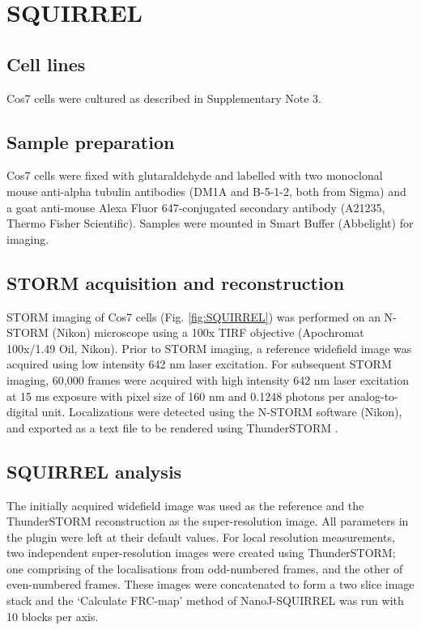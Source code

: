 \section{SQUIRREL}

\subsection{Cell lines}
Cos7 cells were cultured as described in Supplementary Note 3.

\subsection{Sample preparation}

Cos7 cells were fixed with glutaraldehyde and labelled with two monoclonal mouse anti-alpha tubulin antibodies (DM1A and B-5-1-2, both from Sigma) and a goat anti-mouse Alexa Fluor 647-conjugated secondary antibody (A21235, Thermo Fisher Scientific). Samples were mounted in Smart Buffer (Abbelight) for imaging.

\subsection{STORM acquisition and reconstruction}

STORM imaging of Cos7 cells (Fig. \ref{fig:SQUIRREL}) was performed on an N-STORM (Nikon) microscope using a 100x TIRF objective (Apochromat 100x/1.49 Oil, Nikon). Prior to STORM imaging, a reference widefield image was acquired using low intensity 642 nm laser excitation. For subsequent STORM imaging, 60,000 frames were acquired with high intensity 642 nm laser excitation at 15 ms exposure with pixel size of 160 nm and 0.1248 photons per analog-to-digital unit. Localizations were detected using the N-STORM software (Nikon), and exported as a text file to be rendered using ThunderSTORM \cite{ovesny2014thunderstorm}.

\subsection{SQUIRREL analysis}

The initially acquired widefield image was used as the reference and the ThunderSTORM reconstruction as the super-resolution image. All parameters in the plugin were left at their default values. For local resolution measurements, two independent super-resolution images were created using ThunderSTORM; one comprising of the localisations from odd-numbered frames, and the other of even-numbered frames. These images were concatenated to form a two slice image stack and the ‘Calculate FRC-map’ method of NanoJ-SQUIRREL was run with 10 blocks per axis.

